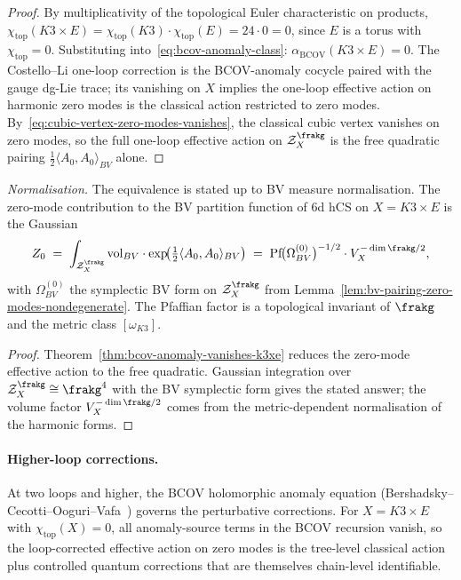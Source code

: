 \begin{proof}
By multiplicativity of the topological Euler characteristic on
products,
$\chi_{\mathrm{top}}(K3 \times E) = \chi_{\mathrm{top}}(K3) \cdot \chi_{\mathrm{top}}(E)
 = 24 \cdot 0 = 0$,
since $E$ is a torus with $\chi_{\mathrm{top}} = 0$. Substituting into~\eqref{eq:bcov-anomaly-class}:
$\alpha_{\mathrm{BCOV}}(K3 \times E) = 0$. The Costello--Li one-loop
correction is the BCOV-anomaly cocycle paired with the gauge dg-Lie
trace; its vanishing on $X$ implies the one-loop effective action on
harmonic zero modes is the classical action restricted to zero modes.
By~\eqref{eq:cubic-vertex-zero-modes-vanishes}, the classical cubic
vertex vanishes on zero modes, so the full one-loop effective action
on $\mathcal{Z}_X^\frakg$ is the free quadratic pairing
$\tfrac{1}{2} \langle A_0, A_0 \rangle_{BV}$ alone.
\end{proof}

\begin{corollary}
\label{cor:zero-mode-partition-function-k3xe}
\noindent\emph{Normalisation.} The equivalence is stated up to BV measure normalisation.
The zero-mode contribution to the BV partition function of $6$d hCS on
$X = K3 \times E$ is the Gaussian
\begin{equation}
\label{eq:zero-mode-partition}
 Z_0 \;=\; \int_{\mathcal{Z}_X^\frakg} \mathrm{vol}_{BV} \cdot \exp\!\bigl(\tfrac{1}{2} \langle A_0, A_0 \rangle_{BV}\bigr)
 \;=\; \mathrm{Pf}\!\bigl(\Omega_{BV}^{(0)}\bigr)^{-1/2} \cdot V_X^{-\dim \frakg/2},
\end{equation}
with $\Omega_{BV}^{(0)}$ the symplectic BV form on
$\mathcal{Z}_X^\frakg$ from Lemma~\ref{lem:bv-pairing-zero-modes-nondegenerate}.
The Pfaffian factor is a topological invariant of $\frakg$ and the
metric class $[\omega_{K3}]$.
\end{corollary}

\begin{proof}
Theorem~\ref{thm:bcov-anomaly-vanishes-k3xe} reduces the zero-mode
effective action to the free quadratic. Gaussian integration over
$\mathcal{Z}_X^\frakg \cong \frakg^4$ with the BV symplectic form gives
the stated answer; the volume factor $V_X^{-\dim\frakg/2}$ comes from
the metric-dependent normalisation of the harmonic forms.
\end{proof}

\paragraph{Higher-loop corrections.}
At two loops and higher, the BCOV holomorphic anomaly equation
\textup{(}Bershadsky--Cecotti--Ooguri--Vafa~\cite{BCOV1993}\textup{)}
governs the perturbative corrections. For $X = K3 \times E$ with
$\chi_{\mathrm{top}}(X) = 0$, all anomaly-source terms in the BCOV
recursion vanish, so the loop-corrected effective action on zero modes
is the tree-level classical action plus controlled quantum corrections
that are themselves chain-level identifiable.


